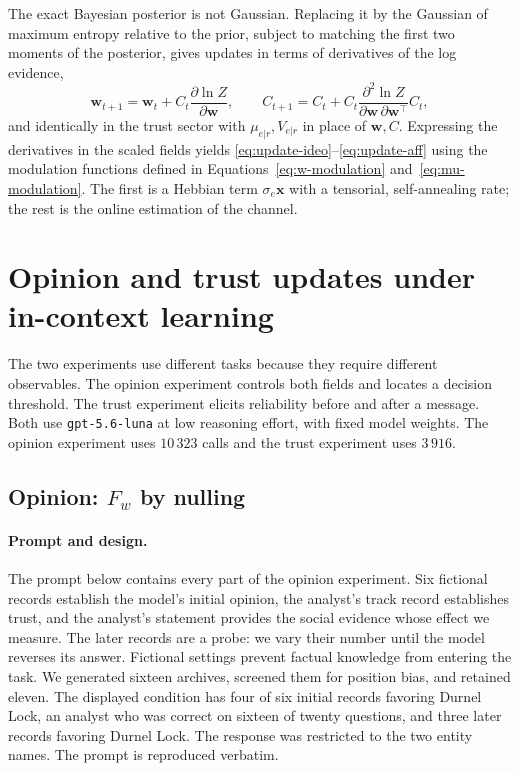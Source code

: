 \documentclass{article}
\newcommand{\Fw}{F_{w}}
\begin{document}
The exact Bayesian posterior is not Gaussian. Replacing it by the Gaussian of
maximum entropy relative to the prior, subject to matching the first two moments
of the posterior, gives updates in terms of derivatives of the log evidence,
%
\begin{equation}
  \mathbf{w}_{t+1} = \mathbf{w}_t + C_t\frac{\partial \ln Z}{\partial \mathbf{w}},
  \qquad
  C_{t+1} = C_t + C_t \frac{\partial^{2}\ln Z}{\partial\mathbf{w}\,\partial\mathbf{w}^{\!\top}} C_t,
\end{equation}
%
and identically in the trust sector with $\mu_{e|r}, V_{e|r}$ in place of
$\mathbf{w}, C$. Expressing the derivatives in the scaled fields yields
\eqref{eq:update-ideo}--\eqref{eq:update-aff} using the modulation functions
defined in Equations~\eqref{eq:w-modulation} and~\eqref{eq:mu-modulation}. The
first is a Hebbian term $\sigma_e\mathbf{x}$ with a
tensorial, self-annealing rate; the rest is the online estimation of the channel.

\section{Opinion and trust updates under in-context learning}
\label{app:llm}

The two experiments use different tasks because they require different
observables. The opinion experiment controls both fields and locates a decision
threshold. The trust experiment elicits reliability before and after a message.
Both use \texttt{gpt-5.6-luna} at low reasoning effort, with fixed model weights.
The opinion experiment uses $10\,323$ calls and the trust experiment uses $3\,916$.

\subsection{Opinion: \texorpdfstring{$\Fw$}{Fw} by nulling}
\label{app:llm-opinion}

\paragraph{Prompt and design.} The prompt below contains every part of the
opinion experiment. Six fictional records establish the model's initial opinion,
the analyst's track record establishes trust, and the analyst's statement provides
the social evidence whose effect we measure. The later records are a probe: we vary
their number until the model reverses its answer. Fictional settings prevent
factual knowledge from entering the task. We generated sixteen archives, screened
them for position bias, and retained eleven. The displayed condition has four of
six initial records favoring Durnel Lock, an analyst who was correct on sixteen of
twenty questions, and three later records favoring Durnel Lock. The response was
restricted to the two entity names. The prompt is reproduced verbatim.
\end{document}
